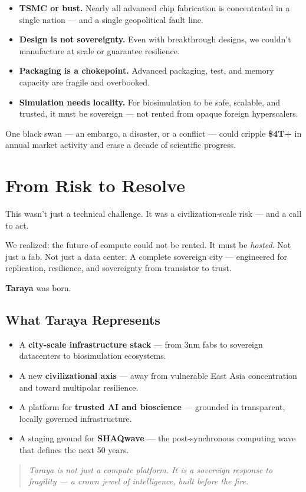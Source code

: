 \documentclass[11pt]{article}
\begin{document}
\begin{itemize}
  \item \textbf{TSMC or bust.} Nearly all advanced chip fabrication is concentrated in a single nation — and a single geopolitical fault line.
  \item \textbf{Design is not sovereignty.} Even with breakthrough designs, we couldn’t manufacture at scale or guarantee resilience.
  \item \textbf{Packaging is a chokepoint.} Advanced packaging, test, and memory capacity are fragile and overbooked.
  \item \textbf{Simulation needs locality.} For biosimulation to be safe, scalable, and trusted, it must be sovereign — not rented from opaque foreign hyperscalers.
\end{itemize}

One black swan --- an embargo, a disaster, or a conflict --- could cripple \textbf{\$4T+} in annual market activity and erase a decade of scientific progress.

\section*{From Risk to Resolve}

This wasn't just a technical challenge. It was a civilization-scale risk — and a call to act.

We realized: the future of compute could not be rented. It must be \textit{hosted}. Not just a fab. Not just a data center. A complete sovereign city — engineered for replication, resilience, and sovereignty from transistor to trust.

\textbf{Taraya} was born.

\subsection*{What Taraya Represents}

\begin{itemize}
  \item A \textbf{city-scale infrastructure stack} — from 3nm fabs to sovereign datacenters to biosimulation ecosystems.
  \item A new \textbf{civilizational axis} — away from vulnerable East Asia concentration and toward multipolar resilience.
  \item A platform for \textbf{trusted AI and bioscience} — grounded in transparent, locally governed infrastructure.
  \item A staging ground for \textbf{SHAQwave} — the post-synchronous computing wave that defines the next 50 years.
\end{itemize}

\begin{quote}
\textit{Taraya is not just a compute platform. It is a sovereign response to fragility — a crown jewel of intelligence, built before the fire.}
\end{quote}
\end{document}

